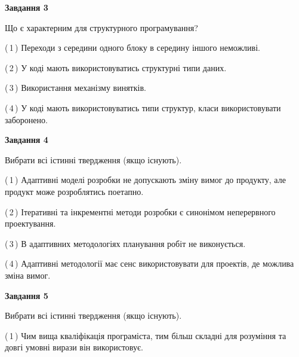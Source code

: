 \documentclass[10pt, ukrainian]{article}
\begin{document}
{\begin {large}
{\begin {center}\textbf{Завдання 3}\end {center}}\par
Що є характерним для структурного програмування?\par
\vspace{2mm}



(\,1\,) Переходи з середини одного блоку в середину іншого неможливі. %



(\,2\,) У коді мають використовуватись структурні типи даних. %



(\,3\,) Використання механізму винятків. %



(\,4\,) У коді мають використовуватись типи структур, класи використовувати заборонено. %


{\begin {center}\textbf{Завдання 4}\end {center}}\par
Вибрати всі істинні твердження (якщо існують).\par
\vspace{2mm}



(\,1\,) Адаптивні моделі розробки не допускають зміну вимог до продукту, але продукт може розроблятись поетапно. %



(\,2\,) Ітеративні та інкрементні методи розробки є синонімом неперервного проектування. %



(\,3\,) В адаптивних методологіях планування робіт не виконується. %



(\,4\,) Адаптивні методології має сенс використовувати для проектів, де можлива зміна вимог. %


{\begin {center}\textbf{Завдання 5}\end {center}}\par
Вибрати всі істинні твердження (якщо існують).\par
\vspace{2mm}



(\,1\,) Чим вища кваліфікація програміста, тим більш складні для розуміння та довгі умовні вирази він використовує. %




\end{large}}
\end{document}
